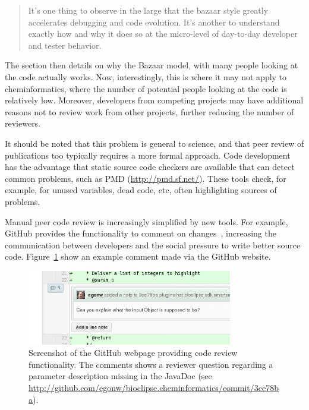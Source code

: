 \documentclass[12pt]{book}
\begin{document}
\begin{quotation}
It's one thing to observe in the large that the bazaar style
greatly accelerates debugging and code evolution. It's
another to understand exactly how and why it does so at the
micro-level of day-to-day developer and tester behavior.
\end{quotation}

The section then details on why the Bazaar model, with many
people looking at the code actually works. Now, interestingly,
this is where it may not apply to cheminformatics, where
the number of potential people looking at the code is
relatively low. Moreover, developers from competing projects
may have additional reasons not to review work from other
projects, further reducing the number of reviewers.

It should be noted that this problem is general to science,
and that peer review of publications too typically requires
a more formal approach. Code development has the advantage
that static source code checkers are available that can
detect common problems, such as PMD (\url{http://pmd.sf.net/}).
These tools check, for example, for unused variables, dead
code, etc, often highlighting sources of problems.

Manual peer code review is increasingly simplified by new
tools. For example, GitHub provides the functionality to
comment on changes~\cite{Chemblaics201005CodeReview},
increasing the communication between developers and the
social pressure to write better source code.
Figure~\ref{fig:githubCodereview} show an example comment
made via the GitHub website.

\begin{figure}
\begin{center}
\includegraphics[width=0.8\textwidth]{graphics/codeReview8.png}
\end{center}
\caption{Screenshot of the GitHub webpage providing code
review functionality. The comments shows a reviewer question
regarding a parameter description missing in the JavaDoc
(see \url{http://github.com/egonw/bioclipse.cheminformatics/commit/3ce78ba}).}
\label{fig:githubCodereview}
\end{figure}
\end{document}
